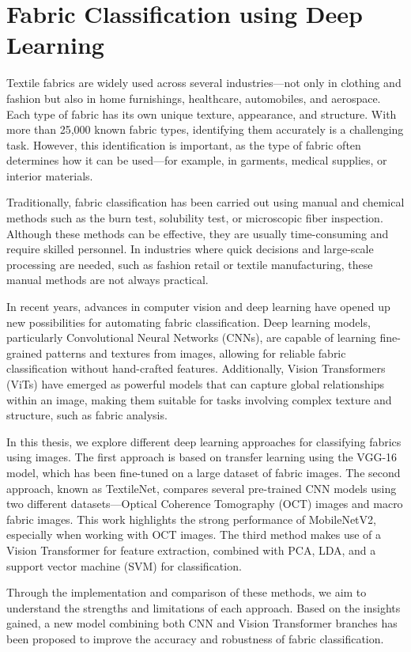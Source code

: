 \chapter{Fabric Classification using Deep Learning}

Textile fabrics are widely used across several industries—not only in clothing and fashion but also in home furnishings, healthcare, automobiles, and aerospace. Each type of fabric has its own unique texture, appearance, and structure. With more than 25,000 known fabric types, identifying them accurately is a challenging task. However, this identification is important, as the type of fabric often determines how it can be used—for example, in garments, medical supplies, or interior materials.

Traditionally, fabric classification has been carried out using manual and chemical methods such as the burn test, solubility test, or microscopic fiber inspection. Although these methods can be effective, they are usually time-consuming and require skilled personnel. In industries where quick decisions and large-scale processing are needed, such as fashion retail or textile manufacturing, these manual methods are not always practical.

In recent years, advances in computer vision and deep learning have opened up new possibilities for automating fabric classification. Deep learning models, particularly Convolutional Neural Networks (CNNs), are capable of learning fine-grained patterns and textures from images, allowing for reliable fabric classification without hand-crafted features. Additionally, Vision Transformers (ViTs) have emerged as powerful models that can capture global relationships within an image, making them suitable for tasks involving complex texture and structure, such as fabric analysis.

In this thesis, we explore different deep learning approaches for classifying fabrics using images. The first approach is based on transfer learning using the VGG-16 model, which has been fine-tuned on a large dataset of fabric images. The second approach, known as TextileNet, compares several pre-trained CNN models using two different datasets—Optical Coherence Tomography (OCT) images and macro fabric images. This work highlights the strong performance of MobileNetV2, especially when working with OCT images. The third method makes use of a Vision Transformer for feature extraction, combined with PCA, LDA, and a support vector machine (SVM) for classification.

Through the implementation and comparison of these methods, we aim to understand the strengths and limitations of each approach. Based on the insights gained, a new model combining both CNN and Vision Transformer branches has been proposed to improve the accuracy and robustness of fabric classification.

